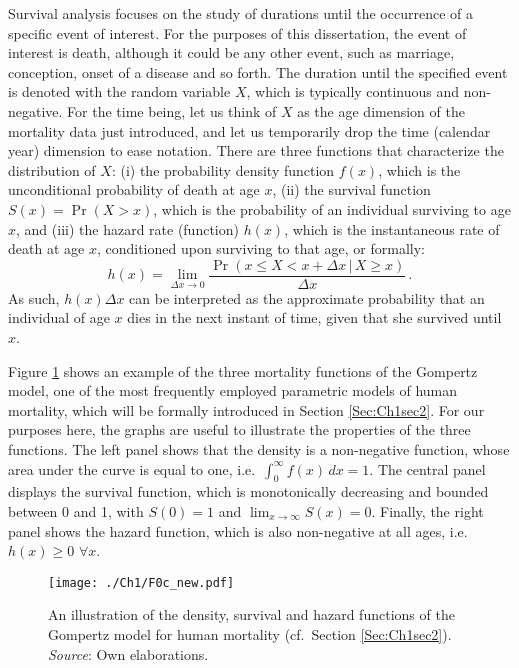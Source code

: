 \documentclass[Thesis]{subfiles}
\begin{document}
Survival analysis focuses on the study of durations until the occurrence of a specific event of interest. For the purposes of this dissertation, the event of interest is death, although it could be any other event, such as marriage, conception, onset of a disease and so forth. The duration until the specified event is denoted with the random variable  $X$, which is typically continuous and non-negative. For the time being, let us think of $X$ as the age dimension of the mortality data just introduced, and let us temporarily drop the time (calendar year) dimension to ease notation. There are three functions that characterize the distribution of $X$: (i) the probability density function $f(x)$, which is the unconditional probability of death at age $x$, (ii) the survival function $S(x) = \Pr(X > x)$, which is the probability of an individual surviving to age $x$, and (iii) the hazard rate (function) $h(x)$, which is the instantaneous rate of death at age $x$, conditioned upon surviving to that age, or formally: 
%  
\begin{equation}\label{Eq:Ch1Hazard}
h(x) = \lim\limits_{\Delta x \rightarrow 0} \frac{\Pr \left(x \leq X < x + \Delta x \,|\, X \geq x \right)}{\Delta x} \, .
\end{equation}
%
As such, $h(x) \Delta x$ can be interpreted as the approximate probability that an individual of age $x$ dies in the next instant of time, given that she survived until $x$.

Figure \ref{Fig:Ch1Functions} shows an example of the three mortality functions of the Gompertz model, one of the most frequently employed parametric models of human mortality, which will be formally introduced in Section \ref{Sec:Ch1sec2}. For our purposes here, the graphs are useful to illustrate the properties of the three functions.  The left panel shows that the density is a non-negative function, whose area under the curve is equal to one, i.e.~$\int_{0}^{\infty}f(x)\,dx = 1$. The central panel displays the survival function, which is monotonically decreasing and bounded between 0 and 1, with $S(0)=1$ and $\lim_{x \rightarrow \infty}S(x)=0$. Finally, the right panel shows the hazard function, which is also non-negative at all ages, i.e.~$h(x)\geq0$ $\forall x$.

\begin{figure}[!ht]
	\begin{center}
	\texttt{[image: ./Ch1/F0c\_new.pdf]}
	\caption{An illustration of the density, survival and hazard functions of the Gompertz model for human mortality (cf.~Section \ref{Sec:Ch1sec2}).\\ \textit{Source}: Own elaborations.}\label{Fig:Ch1Functions}
	\end{center}
\end{figure} 
 
\end{document}
